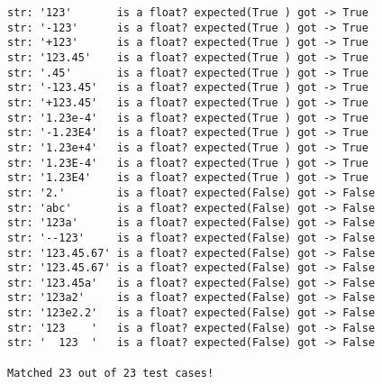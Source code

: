 \begin{verbatim}
str: '123'       is a float? expected(True ) got -> True
str: '-123'      is a float? expected(True ) got -> True
str: '+123'      is a float? expected(True ) got -> True
str: '123.45'    is a float? expected(True ) got -> True
str: '.45'       is a float? expected(True ) got -> True
str: '-123.45'   is a float? expected(True ) got -> True
str: '+123.45'   is a float? expected(True ) got -> True
str: '1.23e-4'   is a float? expected(True ) got -> True
str: '-1.23E4'   is a float? expected(True ) got -> True
str: '1.23e+4'   is a float? expected(True ) got -> True
str: '1.23E-4'   is a float? expected(True ) got -> True
str: '1.23E4'    is a float? expected(True ) got -> True
str: '2.'        is a float? expected(False) got -> False
str: 'abc'       is a float? expected(False) got -> False
str: '123a'      is a float? expected(False) got -> False
str: '--123'     is a float? expected(False) got -> False
str: '123.45.67' is a float? expected(False) got -> False
str: '123.45.67' is a float? expected(False) got -> False
str: '123.45a'   is a float? expected(False) got -> False
str: '123a2'     is a float? expected(False) got -> False
str: '123e2.2'   is a float? expected(False) got -> False
str: '123    '   is a float? expected(False) got -> False
str: '  123  '   is a float? expected(False) got -> False

Matched 23 out of 23 test cases!
\end{verbatim}
